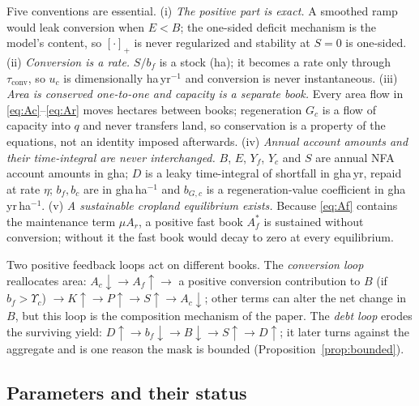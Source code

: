 \documentclass[preprint,12pt,authoryear]{elsarticle}
\newcommand{\pos}[1]{\left[#1\right]_+}
\newcommand{\Ups}{\Upsilon_c}
\newcommand{\tconv}{\tau_{\mathrm{conv}}}
\begin{document}
Five conventions are essential. (i) \emph{The positive part is exact.} A smoothed ramp would leak conversion when $E<B$; the one-sided deficit mechanism is the model's content, so $\pos{\cdot}$ is never regularized and stability at $S=0$ is one-sided. (ii) \emph{Conversion is a rate.} $S/b_f$ is a stock (ha); it becomes a rate only through $\tconv$, so $u_c$ is dimensionally ha\,yr$^{-1}$ and conversion is never instantaneous. (iii) \emph{Area is conserved one-to-one and capacity is a separate book.} Every area flow in \eqref{eq:Ac}--\eqref{eq:Ar} moves hectares between books; regeneration $G_c$ is a flow of capacity into $q$ and never transfers land, so conservation is a property of the equations, not an identity imposed afterwards. (iv) \emph{Annual account amounts and their time-integral are never interchanged.} $B$, $E$, $Y_f$, $Y_c$ and $S$ are annual NFA account amounts in gha; $D$ is a leaky time-integral of shortfall in gha\,yr, repaid at rate $\eta$; $b_f,b_c$ are in gha\,ha$^{-1}$ and $b_{G,c}$ is a regeneration-value coefficient in gha\,yr\,ha$^{-1}$. (v) \emph{A sustainable cropland equilibrium exists.} Because \eqref{eq:Af} contains the maintenance term $\mu A_r$, a positive fast book $A_f^*$ is sustained without conversion; without it the fast book would decay to zero at every equilibrium.

Two positive feedback loops act on different books. The \emph{conversion loop} reallocates area: $A_c\downarrow\to A_f\uparrow\to$ a positive conversion contribution to $B$ (if $b_f>\Ups$) $\to K\uparrow\to P\uparrow\to S\uparrow\to A_c\downarrow$; other terms can alter the net change in $B$, but this loop is the composition mechanism of the paper. The \emph{debt loop} erodes the surviving yield: $D\uparrow\to b_f\downarrow\to B\downarrow\to S\uparrow\to D\uparrow$; it later turns against the aggregate and is one reason the mask is bounded (Proposition~\ref{prop:bounded}).

\subsection{Parameters and their status}\label{sec:params}
\end{document}
